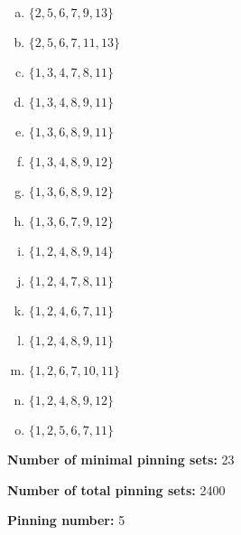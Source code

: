 \documentclass{article}%
\begin{document}
\begin{multicols}{2}
\begin{enumerate}[a)]
\item{\Huge\textcolor{green4}{\textbullet}}$\{2,5,6,7,9,13\}$

\item{\Huge\textcolor{green5}{\textbullet}}$\{2,5,6,7,11,13\}$

\item{\Huge\textcolor{green6}{\textbullet}}$\{1,3,4,7,8,11\}$

\item{\Huge\textcolor{green7}{\textbullet}}$\{1,3,4,8,9,11\}$

\item{\Huge\textcolor{green8}{\textbullet}}$\{1,3,6,8,9,11\}$

\item{\Huge\textcolor{green9}{\textbullet}}$\{1,3,4,8,9,12\}$

\item{\Huge\textcolor{green10}{\textbullet}}$\{1,3,6,8,9,12\}$

\item{\Huge\textcolor{green11}{\textbullet}}$\{1,3,6,7,9,12\}$

\item{\Huge\textcolor{green12}{\textbullet}}$\{1,2,4,8,9,14\}$

\item{\Huge\textcolor{green13}{\textbullet}}$\{1,2,4,7,8,11\}$

\item{\Huge\textcolor{green14}{\textbullet}}$\{1,2,4,6,7,11\}$

\item{\Huge\textcolor{green15}{\textbullet}}$\{1,2,4,8,9,11\}$

\item{\Huge\textcolor{green16}{\textbullet}}$\{1,2,6,7,10,11\}$

\item{\Huge\textcolor{green17}{\textbullet}}$\{1,2,4,8,9,12\}$

\item{\Huge\textcolor{green18}{\textbullet}}$\{1,2,5,6,7,11\}$

\end{enumerate}


\noindent\textbf{Number of minimal pinning sets:} 23

\noindent\textbf{Number of total pinning sets:} 2400

\noindent\textbf{Pinning number:} 5


\end{multicols}
\end{document}
